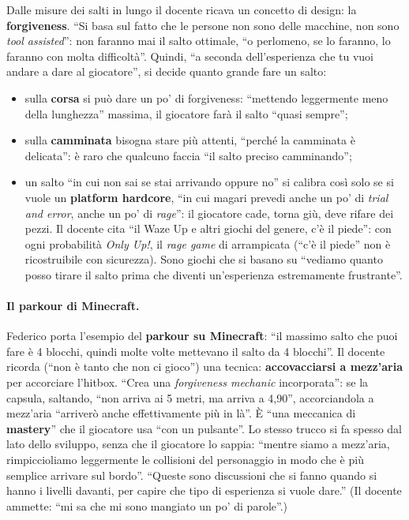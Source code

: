 Dalle misure dei salti in lungo il docente ricava un concetto di design: la
\textbf{forgiveness}. ``Si basa sul fatto che le persone non sono delle macchine, non sono
\emph{tool assisted}'': non faranno mai il salto ottimale, ``o perlomeno, se lo faranno, lo
faranno con molta difficoltà''. Quindi, ``a seconda dell'esperienza che tu vuoi andare a
dare al giocatore'', si decide quanto grande fare un salto:
\begin{itemize}
  \item sulla \textbf{corsa} si può dare un po' di forgiveness: ``mettendo leggermente meno
        della lunghezza'' massima, il giocatore farà il salto ``quasi sempre'';
  \item sulla \textbf{camminata} bisogna stare più attenti, ``perché la camminata è
        delicata'': è raro che qualcuno faccia ``il salto preciso camminando'';
  \item un salto ``in cui non sai se stai arrivando oppure no'' si calibra così solo se si
        vuole un \textbf{platform hardcore}, ``in cui magari prevedi anche un po' di
        \emph{trial and error}, anche un po' di \emph{rage}'': il giocatore cade, torna giù,
        deve rifare dei pezzi. Il docente cita ``il Waze Up e altri giochi del genere, c'è il
        piede'': con ogni probabilità \emph{Only Up!}, il \emph{rage game} di arrampicata
        (``c'è il piede'' non è ricostruibile con sicurezza). Sono giochi che si basano su
        ``vediamo quanto posso tirare il salto prima che diventi un'esperienza estremamente
        frustrante''.
\end{itemize}

\paragraph{Il parkour di Minecraft.} Federico porta l'esempio del \textbf{parkour su
Minecraft}: ``il massimo salto che puoi fare è 4 blocchi, quindi molte volte mettevano il
salto da 4 blocchi''. Il docente ricorda (``non è tanto che non ci gioco'') una tecnica:
\textbf{accovacciarsi a mezz'aria} per accorciare l'hitbox. ``Crea una \emph{forgiveness
mechanic} incorporata'': se la capsula, saltando, ``non arriva ai 5 metri, ma arriva a 4,90'',
accorciandola a mezz'aria ``arriverò anche effettivamente più in là''. È ``una meccanica di
\textbf{mastery}'' che il giocatore usa ``con un pulsante''. Lo stesso trucco si fa spesso
dal lato dello sviluppo, senza che il giocatore lo sappia: ``mentre siamo a mezz'aria,
rimpiccioliamo leggermente le collisioni del personaggio in modo che è più semplice
arrivare sul bordo''. ``Queste sono discussioni che si fanno quando si hanno i livelli
davanti, per capire che tipo di esperienza si vuole dare.'' (Il docente ammette: ``mi sa che
mi sono mangiato un po' di parole''.)

